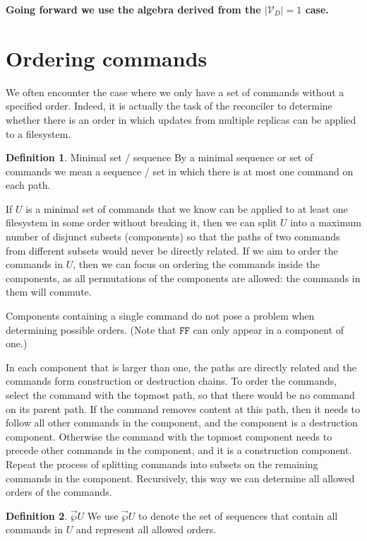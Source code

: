 \documentclass[12pt]{article}
\newcommand{\setvx}[1]{\mathcal{V}_{#1}}
\newcommand{\setd}{\setvx{D}}
\newcommand{\fscommand}[2]{{#1#2}}
\newcommand{\fsregcommandchar}[1]{\mathtt{#1}}
\newcommand{\fsregcommand}[2]{\fscommand{\fsregcommandchar{#1}}{\fsregcommandchar{#2}}}
\newcommand{\cff}{\fsregcommand{F}{F}}
\newcommand{\orderset}[1]{\vec{\wp}{#1}}
\theoremstyle{definition}
\newtheorem{mydef}{Definition}
\begin{document}
{\bf Going forward we use the algebra derived from the $|\setd|=1$ case.}

\section{Ordering commands}

We often encounter the case where we only have a set of commands without a specified order.
Indeed, it is actually the task of the reconciler to determine whether there is an order
in which updates from multiple replicas can be applied to a filesystem.

\begin{mydef}{Minimal set / sequence}
By a minimal sequence or set of commands we mean a sequence / set in which
there is at most one command on each path.
\end{mydef}

If $U$ is a minimal set of commands
that we know can be applied to at least one filesystem in some order without breaking it,
then we can split $U$ into a maximum number of disjunct subsets
(components) so that the paths of two commands from different subsets would never be directly related.
If we aim to order the commands in $U$, then we can focus on ordering the commands
inside the components, as all permutations of the components are allowed:
the commands in them will commute.

Components containing a single command do not pose a problem when determining
possible orders.
(Note that $\cff$ can only appear in a component of one.)

In each component that is larger than one, the paths are directly related
and the commands form construction or destruction chains.
To order the commands,
select the command with the topmost path, so that there would be no command
on its parent path. If the command removes content at this path, then it
needs to follow all other commands in the component, and
the component is a destruction component.
Otherwise the command with the topmost component needs to precede other commands
in the component, and it is a construction component.
Repeat the process of splitting commands into subsets on the remaining commands
in the component. Recursively, this way we can determine all allowed orders of the commands.

\begin{mydef}{$\orderset{U}$}
We use $\orderset{U}$ to denote the set of sequences that contain all commands in $U$
and represent all allowed orders.
\end{mydef}
\end{document}
